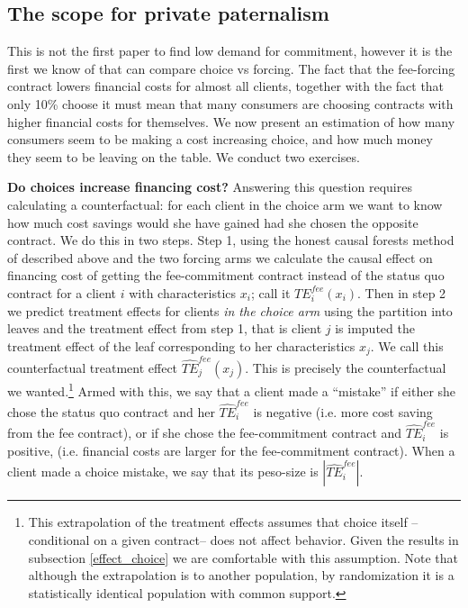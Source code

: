 \documentclass[oneside,11pt]{article}
\begin{document}
\subsection{The scope for private paternalism}
    
This is not the first paper to find low demand for commitment, however it is the first we know of that can compare choice vs forcing. The fact that the fee-forcing contract lowers financial costs for almost all clients, together with the fact that only 10\% choose it must mean that many consumers are choosing contracts with higher financial costs for themselves. We now present an estimation of how many consumers seem to be making a cost increasing choice, and how much money they seem to be leaving on the table. We conduct two exercises. 

\vspace{.2in}
\noindent \textbf{Do choices increase financing cost?} Answering this question requires calculating a counterfactual: for each client in the choice arm we want to know how much cost savings would she have gained had she chosen the opposite contract. We do this in two steps. Step 1, using the honest causal forests method of \cite{atheygrf} described above and the two forcing arms we calculate the causal effect on financing cost of getting the fee-commitment contract instead of the status quo contract for a client $i$ with characteristics $x_i$; call it $TE^{fee}_{i}(x_i)$. Then in step 2 we predict treatment effects for clients \textit{in the choice arm} using the partition into leaves and the treatment effect from step 1, that is client $j$ is imputed the treatment effect of the leaf corresponding to her characteristics $x_j$. We call this counterfactual treatment effect $\widehat{TE}^{fee}_{j}(x_j)$. This is precisely the counterfactual we wanted.\footnote{This extrapolation of the treatment effects assumes that choice itself --conditional on a given contract-- does not affect behavior. Given the results in subsection \ref{effect_choice} we are comfortable with this assumption. Note that although the extrapolation is to another population, by randomization it is a statistically identical population with common support.} Armed with this, we say that a client made a ``mistake'' if either she chose the status quo contract and her $\widehat{TE}^{fee}_{i}$ is negative (i.e. more cost saving from the fee contract), or if she chose the fee-commitment contract and $\widehat{TE}^{fee}_{i}$ is positive, (i.e.  financial costs are larger for the fee-commitment contract). When a client made a choice mistake, we say that its peso-size is $|\widehat{TE}^{fee}_{i}|$. 
\end{document}
